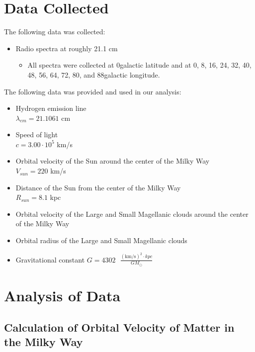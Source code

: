 \documentclass{article}
\begin{document}
\section{Data Collected}

\noindent The following data was collected:

\begin{itemize}
    \item Radio spectra at roughly 21.1 cm
    \begin{itemize}
        \item All spectra were collected at 0\degree \space galactic latitude and at 
        0\degree, 
        8\degree, 
        16\degree, 
        24\degree, 
        32\degree, 
        40\degree, 
        48\degree, 
        56\degree, 
        64\degree, 
        72\degree, 
        80\degree, and 
        88\degree \space galactic longitude.
    \end{itemize}
\end{itemize}

\noindent The following data was provided and used in our analysis:

\begin{itemize}
    \item Hydrogen emission line \\ $\lambda_{em}=21.1061$ cm
    \item Speed of light \\ $c=3.00\cdot10^5$ km/s
    \item Orbital velocity of the Sun around the center of the Milky Way \\ $V_{sun}=220$ km/s
    \item Distance of the Sun from the center of the Milky Way \\ $R_{sun}=8.1$ kpc
    \item Orbital velocity of the Large and Small Magellanic clouds around the center of the Milky Way
    \item Orbital radius of the Large and Small Magellanic clouds
    \item Gravitational constant $G=4302\text{ }\frac{(\text{km/s})^2 \cdot kpc}{GM_{\odot}}$
\end{itemize}

\section{Analysis of Data}

\subsection{Calculation of Orbital Velocity of Matter in the Milky Way}
\end{document}
